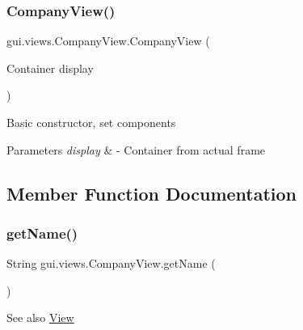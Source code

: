 \subsubsection{\texorpdfstring{Company\+View()}{CompanyView()}}
{\footnotesize\ttfamily gui.\+views.\+Company\+View.\+Company\+View (\begin{DoxyParamCaption}\item[{Container}]{display }\end{DoxyParamCaption})\hspace{0.3cm}{\ttfamily [inline]}}

Basic constructor, set components


\begin{DoxyParams}{Parameters}
{\em display} & -\/ Container from actual frame \\
\hline
\end{DoxyParams}


\subsection{Member Function Documentation}
\mbox{\label{classgui_1_1views_1_1_company_view_affe08c7aa7dfc02d86a18771aa2eb217}} 
\subsubsection{\texorpdfstring{get\+Name()}{getName()}}
{\footnotesize\ttfamily String gui.\+views.\+Company\+View.\+get\+Name (\begin{DoxyParamCaption}{ }\end{DoxyParamCaption})\hspace{0.3cm}{\ttfamily [inline]}}

\begin{DoxySeeAlso}{See also}
\mbox{\hyperlink{classgui_1_1views_1_1_view}{View}} 
\end{DoxySeeAlso}
\mbox{\label{classgui_1_1views_1_1_company_view_ab446dccf76b0195e7f09b9cd0e6d72a0}} 
